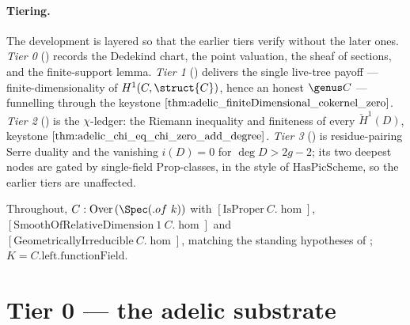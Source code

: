 \paragraph{Tiering.} The development is layered so that the earlier tiers
verify without the later ones.
\emph{Tier 0} () records the
Dedekind chart, the point valuation, the sheaf of sections, and the
finite-support lemma.
\emph{Tier 1} ()
delivers the single live-tree payoff --- finite-dimensionality of
\(H^1(C, \struct{C})\), hence an honest \(\genus C\) --- funnelling
through the keystone
\(\Cref{thm:adelic_finiteDimensional_cokernel_zero}\).
\emph{Tier 2} () is the
\(\chi\)-ledger: the Riemann inequality and finiteness of every
\(\check{H}^1(D)\), keystone
\(\Cref{thm:adelic_chi_eq_chi_zero_add_degree}\).
\emph{Tier 3} () is residue-pairing
Serre duality and the vanishing \(i(D) = 0\) for \(\deg D > 2g - 2\); its
two deepest nodes are gated by single-field \(\mathrm{Prop}\)-classes, in
the style of \(\mathrm{HasPicScheme}\), so the earlier tiers are
unaffected.

\medskip
Throughout, \(C : \mathrm{Over}\,(\Spec (.of\ k))\) with
\([\mathrm{IsProper}\ C.\hom]\),
\([\mathrm{SmoothOfRelativeDimension}\ 1\ C.\hom]\) and
\([\mathrm{GeometricallyIrreducible}\ C.\hom]\), matching the standing
hypotheses of ; \(K = C.\mathrm{left}.\mathrm{functionField}\).

\section{Tier 0 --- the adelic substrate}
\label{sec:RiemannRoch_Adelic_substrate}


